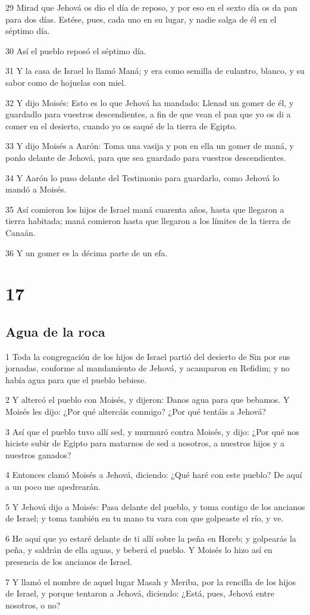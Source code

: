 \par 29 Mirad que Jehová os dio el día de reposo, y por eso en el sexto día os da pan para dos días. Estése, pues, cada uno en su lugar, y nadie salga de él en el séptimo día.
\par 30 Así el pueblo reposó el séptimo día.
\par 31 Y la casa de Israel lo llamó Maná; y era como semilla de culantro, blanco, y su sabor como de hojuelas con miel.
\par 32 Y dijo Moisés: Esto es lo que Jehová ha mandado: Llenad un gomer de él, y guardadlo para vuestros descendientes, a fin de que vean el pan que yo os di a comer en el desierto, cuando yo os saqué de la tierra de Egipto.
\par 33 Y dijo Moisés a Aarón: Toma una vasija y pon en ella un gomer de maná, y ponlo delante de Jehová, para que sea guardado para vuestros descendientes.
\par 34 Y Aarón lo puso delante del Testimonio para guardarlo, como Jehová lo mandó a Moisés.
\par 35 Así comieron los hijos de Israel maná cuarenta años, hasta que llegaron a tierra habitada; maná comieron hasta que llegaron a los límites de la tierra de Canaán.
\par 36 Y un gomer es la décima parte de un efa.

\chapter{17}

\section*{Agua de la roca}

\par 1 Toda la congregación de los hijos de Israel partió del desierto de Sin por sus jornadas, conforme al mandamiento de Jehová, y acamparon en Refidim; y no había agua para que el pueblo bebiese.
\par 2 Y altercó el pueblo con Moisés, y dijeron: Danos agua para que bebamos. Y Moisés les dijo: ¿Por qué altercáis conmigo? ¿Por qué tentáis a Jehová?
\par 3 Así que el pueblo tuvo allí sed, y murmuró contra Moisés, y dijo: ¿Por qué nos hiciste subir de Egipto para matarnos de sed a nosotros, a nuestros hijos y a nuestros ganados?
\par 4 Entonces clamó Moisés a Jehová, diciendo: ¿Qué haré con este pueblo? De aquí a un poco me apedrearán.
\par 5 Y Jehová dijo a Moisés: Pasa delante del pueblo, y toma contigo de los ancianos de Israel; y toma también en tu mano tu vara con que golpeaste el río, y ve.
\par 6 He aquí que yo estaré delante de ti allí sobre la peña en Horeb; y golpearás la peña, y saldrán de ella aguas, y beberá el pueblo. Y Moisés lo hizo así en presencia de los ancianos de Israel.
\par 7 Y llamó el nombre de aquel lugar Masah y Meriba, por la rencilla de los hijos de Israel, y porque tentaron a Jehová, diciendo: ¿Está, pues, Jehová entre nosotros, o no?

